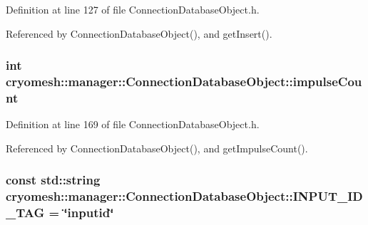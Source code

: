 \-Definition at line 127 of file \-Connection\-Database\-Object.\-h.



\-Referenced by \-Connection\-Database\-Object(), and get\-Insert().

\hypertarget{classcryomesh_1_1manager_1_1ConnectionDatabaseObject_ae78ea47f996ccda8b67325edc74922c3}{
\subsubsection[{impulse\-Count}]{\setlength{\rightskip}{0pt plus 5cm}int {\bf cryomesh\-::manager\-::\-Connection\-Database\-Object\-::impulse\-Count}}}\label{classcryomesh_1_1manager_1_1ConnectionDatabaseObject_ae78ea47f996ccda8b67325edc74922c3}


\-Definition at line 169 of file \-Connection\-Database\-Object.\-h.



\-Referenced by \-Connection\-Database\-Object(), and get\-Impulse\-Count().

\hypertarget{classcryomesh_1_1manager_1_1ConnectionDatabaseObject_a00720d641e03f298f88c5431d948fa1a}{
\subsubsection[{\-I\-N\-P\-U\-T\-\_\-\-I\-D\-\_\-\-T\-A\-G}]{\setlength{\rightskip}{0pt plus 5cm}const std\-::string {\bf cryomesh\-::manager\-::\-Connection\-Database\-Object\-::\-I\-N\-P\-U\-T\-\_\-\-I\-D\-\_\-\-T\-A\-G} = \char`\"{}inputid\char`\"{}}}\label{classcryomesh_1_1manager_1_1ConnectionDatabaseObject_a00720d641e03f298f88c5431d948fa1a}


